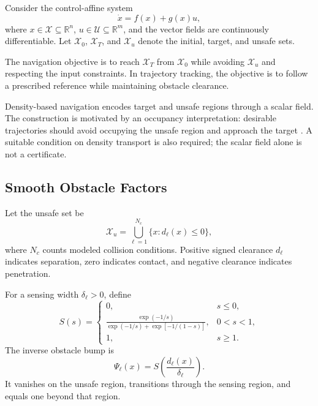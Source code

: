\documentclass[conference]{IEEEtran}
\newcommand{\R}{\mathbb{R}}
\begin{document}
Consider the control-affine system
\begin{equation}
    \dot x=f(x)+g(x)u,
    \label{eq:system}
\end{equation}
where $x\in\mathcal X\subseteq\R^n$,
$u\in\mathcal U\subseteq\R^m$, and the vector fields
are continuously differentiable. Let
$\mathcal X_0$, $\mathcal X_T$, and $\mathcal X_u$
denote the initial, target, and unsafe sets.

The navigation objective is to reach $\mathcal X_T$
from $\mathcal X_0$ while avoiding $\mathcal X_u$
and respecting the input constraints. In trajectory
tracking, the objective is to follow a prescribed
reference while maintaining obstacle clearance.

Density-based navigation encodes target and unsafe
regions through a scalar field. The construction
is motivated by an occupancy interpretation:
desirable trajectories should avoid occupying
the unsafe region and approach the target
\cite{moyalan2024synthesizing,moyalan2024robust}.
A suitable condition on density transport is also
required; the scalar field alone is not a certificate.

\subsection{Smooth Obstacle Factors}

Let the unsafe set be
\begin{equation}
    \mathcal X_u=
    \bigcup_{\ell=1}^{N_c}
    \{x:d_\ell(x)\leq0\},
\end{equation}
where $N_c$ counts modeled collision conditions.
Positive signed clearance $d_\ell$ indicates
separation, zero indicates contact, and negative
clearance indicates penetration.

For a sensing width $\delta_\ell>0$, define
\begin{equation}
    S(s)=
    \begin{cases}
        0, &s\leq0,\\[1mm]
        \displaystyle
        \frac{\exp(-1/s)}
        {\exp(-1/s)+\exp[-1/(1-s)]},
        &0<s<1,\\[3mm]
        1, &s\geq1.
    \end{cases}
    \label{eq:smoothstep}
\end{equation}
The inverse obstacle bump is
\begin{equation}
    \Psi_\ell(x)=
    S\left(\frac{d_\ell(x)}{\delta_\ell}\right).
\end{equation}
It vanishes on the unsafe region, transitions through
the sensing region, and equals one beyond that region.
\end{document}
